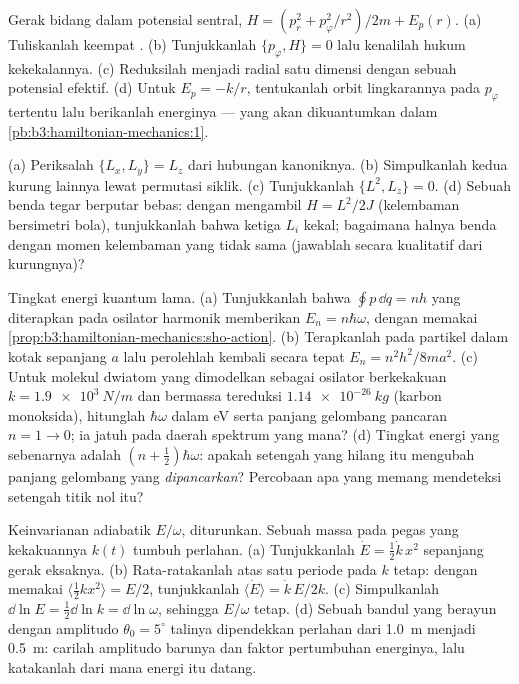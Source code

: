 \begin{exercise}[$\star\star$]\label{exo:b3:hamiltonian-mechanics:8}
Gerak bidang dalam potensial sentral, $H = (p_r^2 + p_\varphi^2/r^2)/2m
+ E_p(r)$. (a) Tuliskanlah keempat . (b)
Tunjukkanlah $\{
p_\varphi, H\} = 0$ lalu kenalilah hukum kekekalannya. (c) Reduksilah
menjadi  radial satu dimensi dengan sebuah potensial efektif.
(d) Untuk $E_p = -k/r$, tentukanlah orbit lingkarannya pada $p_\varphi$
tertentu lalu berikanlah energinya --- yang akan dikuantumkan dalam
\cref{pb:b3:hamiltonian-mechanics:1}.
\end{exercise}

\begin{exercise}[$\star\star$]\label{exo:b3:hamiltonian-mechanics:9}
(a) Periksalah $\{L_x, L_y\} = L_z$ dari hubungan kanoniknya. (b)
Simpulkanlah kedua kurung lainnya lewat permutasi siklik. (c)
Tunjukkanlah $\{L^2, L_z\} = 0$. (d) Sebuah benda tegar berputar bebas:
dengan mengambil $H =
L^2/2J$ (kelembaman bersimetri bola), tunjukkanlah
bahwa ketiga $L_i$ kekal; bagaimana halnya benda dengan momen kelembaman
yang tidak sama (jawablah secara kualitatif dari kurungnya)?
\end{exercise}

\begin{exercise}[$\star\star\star$]\label{exo:b3:hamiltonian-mechanics:10}
Tingkat energi kuantum lama. (a) Tunjukkanlah bahwa $\oint p\,\dd q = nh$
yang diterapkan pada osilator harmonik memberikan $E_n = n\hbar\omega$,
dengan memakai
\cref{prop:b3:hamiltonian-mechanics:sho-action}. (b) Terapkanlah pada
partikel dalam kotak sepanjang $a$ lalu perolehlah kembali secara tepat $E_n =
n^2h^2/8ma^2$. (c) Untuk molekul dwiatom yang dimodelkan sebagai
osilator berkekakuan $k = \qty{1.9e3}{N/m}$ dan bermassa tereduksi $\qty{1.14e-26}
{kg}$ (karbon monoksida), hitunglah $\hbar\omega$ dalam eV serta panjang
gelombang pancaran $n = 1 \to 0$; ia jatuh pada daerah spektrum yang
mana? (d) Tingkat energi yang sebenarnya adalah $(n + \tfrac12)\hbar\omega$:
apakah setengah yang hilang itu mengubah panjang gelombang yang
\emph{dipancarkan}? Percobaan apa yang memang mendeteksi setengah titik
nol itu?
\end{exercise}

\begin{exercise}[$\star\star\star$]\label{exo:b3:hamiltonian-mechanics:11}
Keinvarianan adiabatik $E/\omega$, diturunkan. Sebuah massa pada pegas
yang kekakuannya $k(t)$ tumbuh perlahan. (a) Tunjukkanlah $\dot E = \tfrac12\dot k\,
x^2$ sepanjang gerak eksaknya. (b) Rata-ratakanlah atas satu periode
pada $k$ tetap: dengan memakai $\langle\tfrac12 kx^2\rangle = E/2$,
tunjukkanlah $\langle\dot E\rangle
= \dot k\,E/2k$. (c) Simpulkanlah $\dd\ln E = \tfrac12\dd\ln k = \dd\ln
\omega$, sehingga $E/\omega$ tetap. (d) Sebuah bandul yang berayun
dengan amplitudo $\theta_0 = 5^\circ$ talinya dipendekkan perlahan dari
\qty{1.0}{m} menjadi \qty{0.5}{m}: carilah amplitudo barunya dan faktor
pertumbuhan energinya, lalu katakanlah dari mana energi itu datang.
\end{exercise}


